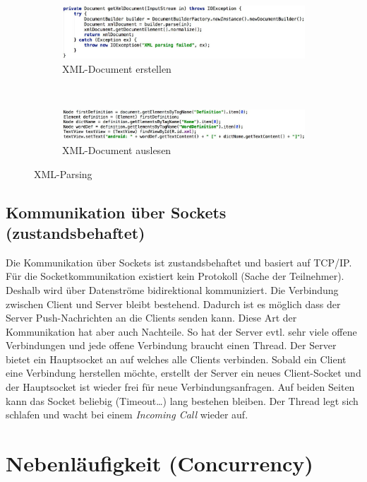 \begin{figure}
	\centering
	\begin{subfigure}[b]{0.4\textwidth}
		\includegraphics[width=\textwidth]{fig/xml-document-erstellen}
		\caption{XML-Document erstellen}
	\end{subfigure}
	~
	\begin{subfigure}[b]{0.4\textwidth}
		\includegraphics[width=\textwidth]{fig/xml-document-auslesen}
		\caption{XML-Document auslesen}
	\end{subfigure}
	\caption{XML-Parsing}
	\label{fig:xml}
\end{figure}

\subsection{Kommunikation über Sockets (zustandsbehaftet)}

Die Kommunikation über Sockets ist zustandsbehaftet und basiert auf TCP/IP. Für die Socketkommunikation existiert kein Protokoll (Sache der Teilnehmer). Deshalb wird über Datenströme bidirektional kommuniziert. Die Verbindung zwischen Client und Server bleibt bestehend. Dadurch ist es möglich dass der Server Push-Nachrichten an die Clients senden kann. Diese Art der Kommunikation hat aber auch Nachteile. So hat der Server evtl. sehr viele offene Verbindungen und jede offene Verbindung braucht einen Thread.
Der Server bietet ein Hauptsocket an auf welches alle Clients verbinden. Sobald ein Client eine Verbindung herstellen möchte, erstellt der Server ein neues Client-Socket und der Hauptsocket ist wieder frei für neue Verbindungsanfragen. Auf beiden Seiten kann das Socket beliebig (Timeout\dots) lang bestehen bleiben. Der Thread legt sich schlafen und wacht bei einem \emph{Incoming Call} wieder auf.

\section{Nebenläufigkeit (Concurrency)}

